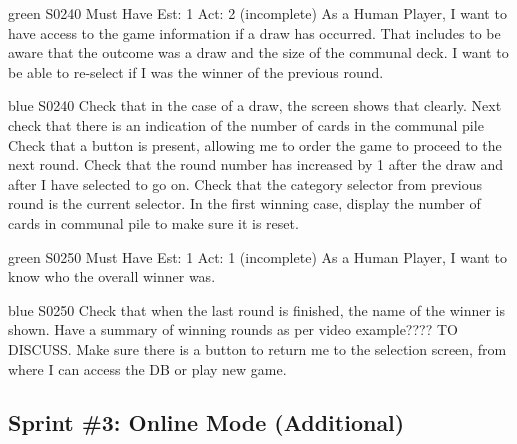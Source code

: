 
\newpage

\begin{card}{green}
{S0240}
{Must Have}
{Est: 1}
{Act: 2 (incomplete)}
As a Human Player, I want to have access to the game information if a draw has occurred. 
That includes to be aware that the outcome was a draw and the size of the communal deck. 
I want to be able to re-select if I was the winner of the previous round. 
\end{card}

\begin{card}{blue}
{S0240}{}{}{}
Check that in the case of a draw, the screen shows that clearly. 
Next check that there is an indication of the number of cards in the communal pile Check that a button is present, allowing me to order the game to proceed to the next round. 
Check that the round number has increased by 1 after the draw and after I have selected to go on. 
Check that the category selector from previous round is the current selector. 
In the first winning case, display the number of cards in communal pile to make sure it is reset.
\end{card}


\newpage

\begin{card}{green}
{S0250}
{Must Have}
{Est: 1}
{Act: 1 (incomplete)}
As a Human Player, I want to know who the overall winner was.
\end{card}

\begin{card}{blue}
{S0250}{}{}{}
Check that when the last round is finished, the name of the winner is shown. 
Have a summary of winning rounds as per video example???? TO DISCUSS.
Make sure there is a button to return me to the selection screen, from where I can access the DB or play new game.
\end{card}


\newpage
\subsection{Sprint \#3: Online Mode (Additional)}
\label{appendix:user_stories_online_additional}
\bigskip



